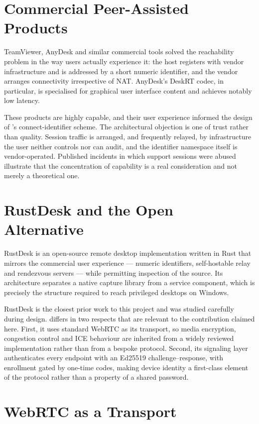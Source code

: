 \section{Commercial Peer-Assisted Products}

TeamViewer, AnyDesk and similar commercial tools solved the reachability problem
in the way users actually experience it: the host registers with vendor
infrastructure and is addressed by a short numeric identifier, and the vendor
arranges connectivity irrespective of NAT. AnyDesk's DeskRT codec, in
particular, is specialised for graphical user interface content and achieves
notably low latency.

These products are highly capable, and their user experience informed the design
of \updesk{}'s connect-identifier scheme. The architectural objection is one of
trust rather than quality. Session traffic is arranged, and frequently relayed,
by infrastructure the user neither controls nor can audit, and the identifier
namespace itself is vendor-operated. Published incidents in which support
sessions were abused illustrate that the concentration of capability is a real
consideration and not merely a theoretical one.

\section{RustDesk and the Open Alternative}

RustDesk is an open-source remote desktop implementation written in Rust that
mirrors the commercial user experience --- numeric identifiers, self-hostable
relay and rendezvous servers --- while permitting inspection of the source. Its
architecture separates a native capture library from a service component, which
is precisely the structure required to reach privileged desktops on Windows.

RustDesk is the closest prior work to this project and was studied carefully
during design. \updesk{} differs in two respects that are relevant to the
contribution claimed here. First, it uses standard WebRTC as its transport, so
media encryption, congestion control and ICE behaviour are inherited from a
widely reviewed implementation rather than from a bespoke protocol. Second, its
signaling layer authenticates every endpoint with an Ed25519
challenge--response, with enrollment gated by one-time codes, making device
identity a first-class element of the protocol rather than a property of a
shared password.

\section{WebRTC as a Transport}

